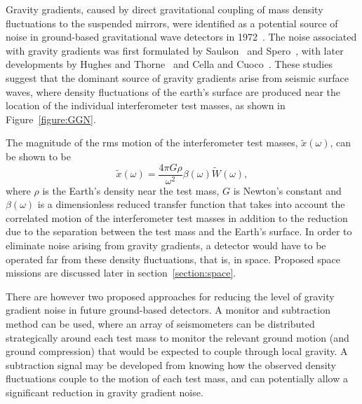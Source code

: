 \documentclass{article}
\begin{document}
Gravity gradients, caused by direct gravitational coupling of mass density
fluctuations to the suspended mirrors, were identified as a potential source of
noise in ground-based gravitational wave detectors in 1972~\cite{Weiss}. The
noise associated with gravity gradients was first formulated by
Saulson~\cite{Saulson1} and Spero~\cite{Spero}, with later developments by
Hughes and Thorne~\cite{Thorne:1998} and Cella and Cuoco~\cite{Beccariay:1998}.
These studies suggest that the dominant source of gravity gradients arise from
seismic surface waves, where density fluctuations of the earth's surface are
produced near the location of the individual interferometer test masses, as
shown in Figure~\ref{figure:GGN}.


The magnitude of the rms motion of the interferometer test masses,
$\tilde{x}(\omega)$, can be shown to be~\cite{Thorne:1998}
%
\begin{equation}
  \tilde{x}(\omega) = \frac{4 \pi G \rho}{\omega^{2}} \beta(\omega)
\tilde{W}(\omega),
  \label{equation:GGN}
\end{equation}
%
where $\rho$ is the Earth's density near the test mass, $G$ is Newton's constant
and $\beta(\omega)$ is a dimensionless reduced transfer function that takes into
account the correlated motion of the interferometer test masses in addition to
the reduction due to the separation between the test mass and the Earth's
surface.  In order to eliminate noise arising from gravity gradients, a detector
would have to be operated far from these density fluctuations, that is, in
space.  Proposed space missions are discussed later in
section~\ref{section:space}.

There are however two proposed approaches for reducing the level of gravity
gradient noise in future ground-based detectors. A monitor and subtraction
method can be used, where an array of seismometers can be distributed
strategically around each test mass to monitor the relevant ground motion (and
ground compression) that would be expected to couple through local gravity.  A
subtraction signal may be developed from knowing how the observed density
fluctuations couple to the motion of each test mass, and can potentially allow a
significant reduction in gravity gradient noise.
\end{document}
